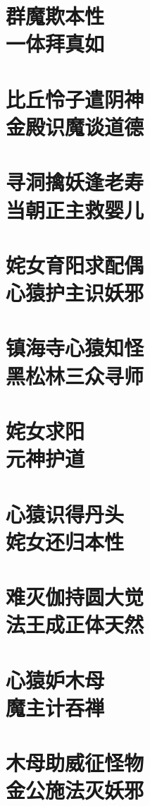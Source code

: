 \documentclass[a4paper,12pt,UTF8,twoside]{ctexbook}
\begin{document}
\chapter[群魔欺本性\ 一体拜真如]{群魔欺本性\\一体拜真如}
\chapter[比丘怜子遣阴神\ 金殿识魔谈道德]{比丘怜子遣阴神\\金殿识魔谈道德}
\chapter[寻洞擒妖逢老寿\ 当朝正主救婴儿]{寻洞擒妖逢老寿\\当朝正主救婴儿}
\chapter[姹女育阳求配偶\ 心猿护主识妖邪]{姹女育阳求配偶\\心猿护主识妖邪}
\chapter[镇海寺心猿知怪\ 黑松林三众寻师]{镇海寺心猿知怪\\黑松林三众寻师}
\chapter[姹女求阳\ 元神护道]{姹女求阳\\元神护道}
\chapter[心猿识得丹头\ 姹女还归本性]{心猿识得丹头\\姹女还归本性}
\chapter[难灭伽持圆大觉\ 法王成正体天然]{难灭伽持圆大觉\\法王成正体天然}
\chapter[心猿妒木母\ 魔主计吞禅]{心猿妒木母\\魔主计吞禅}
\chapter[木母助威征怪物\ 金公施法灭妖邪]{木母助威征怪物\\金公施法灭妖邪}
\end{document}
